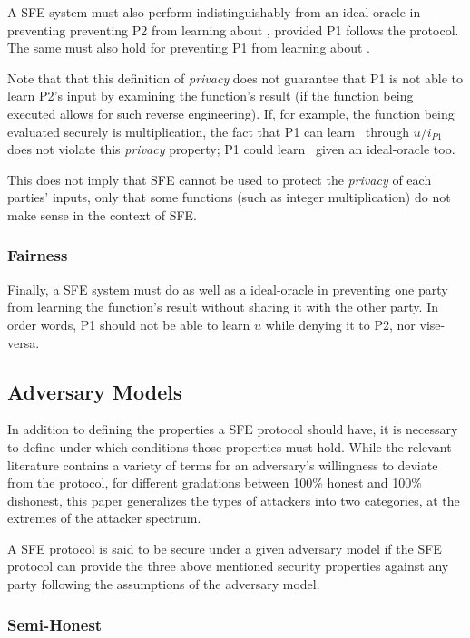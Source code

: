 A \ac{SFE} system must also perform indistinguishably from an ideal-oracle in preventing preventing \ac{P2} from learning about \ponein, provided \ac{P1} follows the protocol.  The same must also hold for preventing \ac{P1} from learning about \ptwoin.

Note that that this definition of \emph{privacy} does not guarantee that \ac{P1} is not able to learn \ac{P2}'s input by examining the function's result (if the function being executed allows for such reverse engineering).  If, for example, the function being evaluated securely is multiplication, the fact that \ac{P1} can learn \ptwoin\ through $u/i_{P1}$ does not violate this \emph{privacy} property; \ac{P1} could learn \ptwoin\ given an ideal-oracle too.

This does not imply that \ac{SFE} cannot be used to protect the \emph{privacy} of each parties' inputs, only that some functions (such as integer multiplication) do not make sense in the context of \ac{SFE}.

\subsubsection{Fairness}

Finally, a \ac{SFE} system must do as well as a ideal-oracle in preventing one party  from learning the function's result without sharing it with the other party. In order words, \ac{P1} should not be able to learn $u$ while denying it to \ac{P2}, nor vise-versa.

\subsection{Adversary Models}

In addition to defining the properties a \ac{SFE} protocol should have, it is necessary to define under which conditions those properties must hold.  While the relevant literature contains a variety of terms for an adversary's willingness to deviate from the protocol, for different gradations between 100\% honest and 100\% dishonest, this paper generalizes the types of attackers into two categories, at the extremes of the attacker spectrum.

A \ac{SFE} protocol is said to be secure under a given adversary model if the \ac{SFE} protocol can provide the three above mentioned security properties against any party following the assumptions of the adversary model.


\subsubsection{Semi-Honest}

